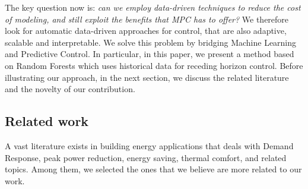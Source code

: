 \textcolor[rgb]{0,0,1}{The key question now is: \emph{can we employ data-driven techniques to reduce the cost of modeling, and still exploit the benefits that MPC has to offer?}
We therefore look for automatic data-driven approaches for control, that are also adaptive, scalable and interpretable.
We solve this problem by bridging Machine Learning and Predictive Control. In particular, in this paper, we present a method based on Random Forests which uses historical data for receding horizon control. Before illustrating our approach, in the next section, we discuss the related literature and the novelty of our contribution.}







\textcolor[rgb]{0,0,1}{
\subsection{Related work}
A vast literature exists in building energy applications that deals with Demand Response, peak power reduction, energy saving, thermal comfort, and related topics.
Among them, we selected the ones that we believe are more related to our work.}

